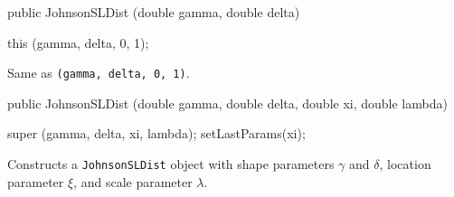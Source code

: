 \begin{code}

   public JohnsonSLDist (double gamma, double delta)\begin{hide} {
      this (gamma, delta, 0, 1);
   }\end{hide}
\end{code}
  \begin{tabb}
    Same as 
    {\texttt{(gamma, delta, 0, 1)}}.
  \end{tabb}
\begin{code}

   public JohnsonSLDist (double gamma, double delta,
                         double xi, double lambda)\begin{hide} {
      super (gamma, delta, xi, lambda);
      setLastParams(xi);
   }\end{hide}
\end{code}
  \begin{tabb} Constructs a \texttt{JohnsonSLDist} object
   with shape parameters $\gamma$ and $\delta$,
   location parameter $\xi$, and scale parameter $\lambda$.
  \end{tabb}

